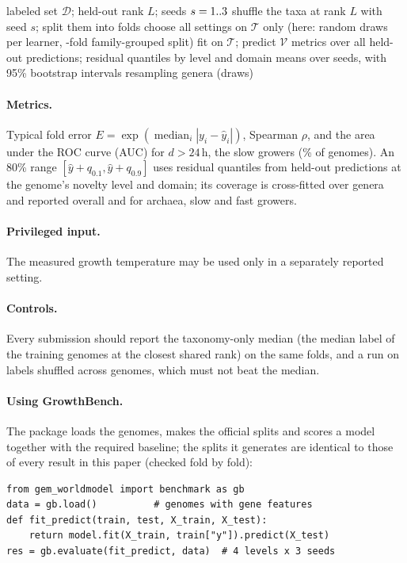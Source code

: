 \documentclass{article}
\begin{document}
\begin{algorithm}[t]
\caption{Nested lineage-held-out evaluation}\label{alg:nested}
\small
\begin{algorithmic}[1]
\Require labeled set $\mathcal{D}$; held-out rank $L$; seeds $s=1..3$
  \State shuffle the taxa at rank $L$ with seed $s$; split them into \NFolds folds
    \State choose all settings on $\mathcal{T}$ only (here: \NTuneCandidates random draws per learner, \NTuneFolds-fold family-grouped split)
    \State fit on $\mathcal{T}$; predict $\mathcal{V}$
  \EndFor
  \State metrics over all held-out predictions; residual quantiles by level and domain
\EndFor
\State \Return means over seeds, with 95\% bootstrap intervals resampling genera (\NBootDraws draws)
\end{algorithmic}
\end{algorithm}

\paragraph{Metrics.} Typical fold error $E=\exp(\operatorname{median}_i|y_i-\hat y_i|)$, Spearman $\rho$, and the area
under the ROC curve (AUC) for $d>24$\,h, the slow growers (\SlowBaseRate\% of genomes). An 80\% range
$[\hat y+q_{0.1},\hat y+q_{0.9}]$ uses residual quantiles from held-out predictions at the genome's novelty level and
domain; its coverage is cross-fitted over genera and reported overall and for archaea, slow and fast growers.
\paragraph{Privileged input.} The measured growth temperature may be used only in a separately reported setting.
\paragraph{Controls.} Every submission should report the taxonomy-only median (the median label of the training genomes at
the closest shared rank) on the same folds, and a run on labels shuffled across genomes, which must not beat the median.

\paragraph{Using GrowthBench.} The package loads the genomes, makes the official splits and scores a model together with the
required baseline; the splits it generates are identical to those of every result in this paper (checked fold by fold):
\begin{verbatim}
from gem_worldmodel import benchmark as gb
data = gb.load()          # genomes with gene features
def fit_predict(train, test, X_train, X_test):
    return model.fit(X_train, train["y"]).predict(X_test)
res = gb.evaluate(fit_predict, data)  # 4 levels x 3 seeds
\end{verbatim}
\end{document}
